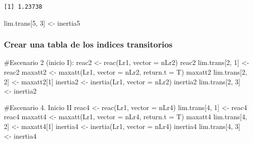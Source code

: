 \documentclass[
  12pt,
  letterpaper,
]{book}
\newenvironment{Shaded}{\begin{snugshade}}{\end{snugshade}}
\newcommand{\AttributeTok}[1]{\textcolor[rgb]{0.40,0.45,0.13}{#1}}
\newcommand{\CommentTok}[1]{\textcolor[rgb]{0.37,0.37,0.37}{#1}}
\newcommand{\DecValTok}[1]{\textcolor[rgb]{0.68,0.00,0.00}{#1}}
\newcommand{\FunctionTok}[1]{\textcolor[rgb]{0.28,0.35,0.67}{#1}}
\newcommand{\NormalTok}[1]{\textcolor[rgb]{0.00,0.23,0.31}{#1}}
\newcommand{\OtherTok}[1]{\textcolor[rgb]{0.00,0.23,0.31}{#1}}
\begin{document}
\begin{verbatim}
[1] 1.23738
\end{verbatim}

\begin{Shaded}
\begin{Highlighting}[]
\NormalTok{lim.trans[}\DecValTok{5}\NormalTok{, }\DecValTok{3}\NormalTok{] }\OtherTok{\textless{}{-}}\NormalTok{ inertia5}
\end{Highlighting}
\end{Shaded}

\subsubsection{Crear una tabla de los indices
transitorios}\label{crear-una-tabla-de-los-indices-transitorios}

\begin{Shaded}
\begin{Highlighting}[]
\CommentTok{\#Escenario 2 (inicio I):}
\NormalTok{reac2 }\OtherTok{\textless{}{-}} \FunctionTok{reac}\NormalTok{(Lr1, }\AttributeTok{vector =}\NormalTok{ nLr2)}
\NormalTok{reac2}
\NormalTok{lim.trans[}\DecValTok{2}\NormalTok{, }\DecValTok{1}\NormalTok{] }\OtherTok{\textless{}{-}}\NormalTok{ reac2}
\NormalTok{maxatt2 }\OtherTok{\textless{}{-}} \FunctionTok{maxatt}\NormalTok{(Lr1, }\AttributeTok{vector =}\NormalTok{ nLr2, }\AttributeTok{return.t =}\NormalTok{ T)}
\NormalTok{maxatt2}
\NormalTok{lim.trans[}\DecValTok{2}\NormalTok{, }\DecValTok{2}\NormalTok{] }\OtherTok{\textless{}{-}}\NormalTok{ maxatt2[}\DecValTok{1}\NormalTok{]}
\NormalTok{inertia2 }\OtherTok{\textless{}{-}} \FunctionTok{inertia}\NormalTok{(Lr1, }\AttributeTok{vector =}\NormalTok{ nLr2)}
\NormalTok{inertia2}
\NormalTok{lim.trans[}\DecValTok{2}\NormalTok{, }\DecValTok{3}\NormalTok{] }\OtherTok{\textless{}{-}}\NormalTok{ inertia2}

\CommentTok{\#Escenario 4. Inicio II}
\NormalTok{reac4 }\OtherTok{\textless{}{-}} \FunctionTok{reac}\NormalTok{(Lr1, }\AttributeTok{vector =}\NormalTok{ nLr4)}
\NormalTok{lim.trans[}\DecValTok{4}\NormalTok{, }\DecValTok{1}\NormalTok{] }\OtherTok{\textless{}{-}}\NormalTok{ reac4}
\NormalTok{reac4}
\NormalTok{maxatt4 }\OtherTok{\textless{}{-}} \FunctionTok{maxatt}\NormalTok{(Lr1, }\AttributeTok{vector =}\NormalTok{ nLr4, }\AttributeTok{return.t =}\NormalTok{ T)}
\NormalTok{maxatt4}
\NormalTok{lim.trans[}\DecValTok{4}\NormalTok{, }\DecValTok{2}\NormalTok{] }\OtherTok{\textless{}{-}}\NormalTok{ maxatt4[}\DecValTok{1}\NormalTok{]}
\NormalTok{inertia4 }\OtherTok{\textless{}{-}} \FunctionTok{inertia}\NormalTok{(Lr1, }\AttributeTok{vector =}\NormalTok{ nLr4)}
\NormalTok{inertia4}
\NormalTok{lim.trans[}\DecValTok{4}\NormalTok{, }\DecValTok{3}\NormalTok{] }\OtherTok{\textless{}{-}}\NormalTok{ inertia4}
\end{Highlighting}
\end{Shaded}
\end{document}
